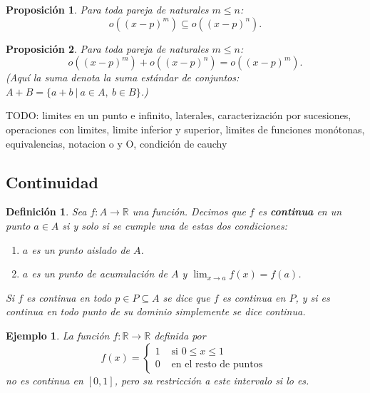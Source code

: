 \documentclass{article}
\newtheorem{prop}{Proposición}
\newtheorem{define}{Definición}
\newtheorem{ejem}{Ejemplo}
\newcommand{\reales}{\mathbb{R}}
\begin{document}
\begin{prop}
	Para toda pareja de naturales $m \leq n$:
	\begin{equation*}
		o((x-p)^m) \subseteq o((x-p)^n).
	\end{equation*}
\end{prop}

\begin{prop}
	Para toda pareja de naturales $m \leq n$:
	\begin{equation*}
		o((x-p)^m) + o((x-p)^n) = o((x-p)^m).
	\end{equation*}
	(Aquí la suma denota la suma estándar de conjuntos: $A+B = \{a+b\ |\ a\in A,\ b\in B \}$.)
\end{prop}


TODO: limites en un punto e infinito, laterales, caracterización por sucesiones, operaciones con limites, limite inferior y superior, limites de funciones monótonas, equivalencias, notacion o y O, condición de cauchy

\subsection{Continuidad}
\begin{define}
	Sea $f: A \rightarrow \reales$ una función. Decimos que $f$ es \textbf{continua} en un punto $a \in A$ si y solo si se cumple una de estas dos condiciones:
	\begin{enumerate}
		\item
		$a$ es un punto aislado de $A$.
		\item
		$a$ es un punto de acumulación de $A$ y $\lim_{x \rightarrow a} f(x) = f(a)$.
	\end{enumerate}
	Si $f$ es continua en todo $p \in P \subseteq A$ se dice que $f$ es continua en $P$, y si es continua en todo punto de su dominio simplemente se dice continua.
\end{define}

\begin{ejem}
	La función $f: \reales \rightarrow \reales$ definida por
	\begin{equation*}
		f(x) =
		\left\lbrace
		\begin{array}{cc}
			1 & \text{ si } 0 \leq x \leq 1 \\
			0 & \text{ en el resto de puntos }
		\end{array}\right.
	\end{equation*}
	no es continua en $[0, 1]$, pero su restricción a este intervalo si lo es.
\end{ejem}
\end{document}
